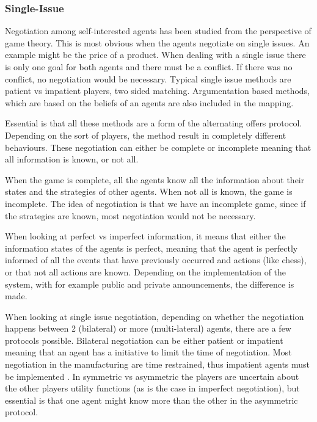 \subsubsection{Single-Issue}

Negotiation among self-interested agents has been studied from the perspective of game theory. This is most obvious when the agents negotiate on single issues. An example might be the price of a product. When dealing with a single issue there is only one goal for both agents and there must be a conflict. If there was no conflict, no negotiation would be necessary. Typical single issue methods are patient vs impatient players, two sided matching. Argumentation based methods, which are based on the beliefs of an agents are also included in the mapping.

Essential is that all these methods are a form of the alternating offers protocol. Depending on the sort of players, the method result in completely different behaviours. These negotiation can either be complete or incomplete meaning that all information is known, or not all. 

When the game is complete, all the agents know all the information about their states and the strategies of other agents. When not all is known, the game is incomplete. The idea of negotiation is that we have an incomplete game, since if the strategies are known, most negotiation would not be necessary.

When looking at perfect vs imperfect information, it means that either the information states of the agents is perfect, meaning that the agent is perfectly informed of all the events that have previously occurred and actions (like chess), or that not all actions are known. Depending on the implementation of the system, with for example public and private announcements, the difference is made. 

When looking at single issue negotiation, depending on whether the negotiation happens between 2 (bilateral) or more (multi-lateral) agents, there are a few protocols possible. Bilateral negotiation can be either patient or impatient \citep{fatima2014negotiation} meaning that an agent has a initiative to limit the time of negotiation. Most negotiation in the manufacturing are time restrained, thus impatient agents must be implemented \citep{kraus1995multiagent}. In symmetric vs asymmetric the players are uncertain about the other players utility functions (as is the case in imperfect negotiation), but essential is that one agent might know more than the other in the asymmetric protocol.

